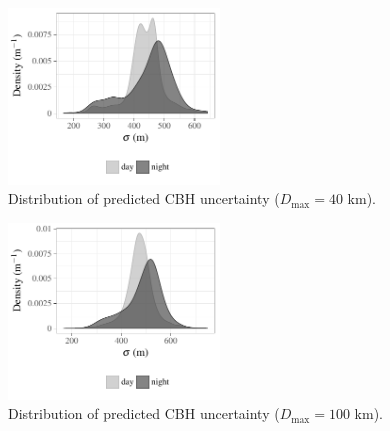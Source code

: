 \documentclass[essd,manuscript]{copernicus}\usepackage[]{graphicx}\usepackage[]{color}
\newenvironment{knitrout}{}{} %
\begin{document}
\begin{figure}
  \centering
\begin{knitrout}
\color{fgcolor}

{\centering \includegraphics[width=0.5\textwidth]{figure/method-cbase-rmse-1} 

}



\end{knitrout}
  \caption{Distribution of predicted CBH uncertainty ($D_\text{max} = 40$ km).}
  \label{fig:uncertainty}
\end{figure}

\begin{figure}
  \centering
\begin{knitrout}
\color{fgcolor}

{\centering \includegraphics[width=0.5\textwidth]{figure/method-cbase-rmse-100-1} 

}



\end{knitrout}
  \caption{Distribution of predicted CBH uncertainty ($D_\text{max} = 100$ km).}
  \label{fig:uncertainty}
\end{figure}
\end{document}
